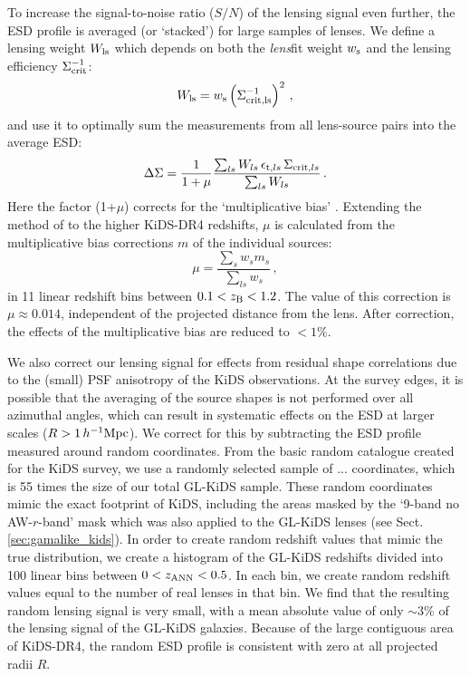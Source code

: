 \documentclass[usenatbib]{mnras}
\newcommand{\hMpc}{\, h^{-1}{\rm{Mpc}} }
\newcommand{\un}[1]{_{\rm #1}}
\begin{document}
To increase the signal-to-noise ratio ($S/N$) of the lensing signal even further, the ESD profile is averaged (or `stacked') for large samples of lenses. We define a lensing weight $W\un{ls}$ which depends on both the \emph{lens}fit weight $w\un{s}$ and the lensing efficiency $\Sigma\un{crit}^{-1}$:
\begin{equation}
	W_{\rm{ls}} = w_{\rm s} \left( \Sigma_{\rm crit,ls}^{-1} \right)^2 \, ,
	\label{eq:weights}
\end{equation}
and use it to optimally sum the measurements from all lens-source pairs into the average ESD:
\begin{equation}
	\Delta\Sigma = \frac{1}{1+\mu} \frac{\sum_{ls} W_{ls} \, \epsilon_{{\rm t},ls} \, \Sigma_{{\rm crit},ls} }{ \sum_{ls}{W_{ls}} }  \, .
	\label{eq:ESDmeasured}
\end{equation}
Here the factor (1+$\mu$) corrects for the `multiplicative bias' \cite[]{fenechconti2017}. Extending the method of \cite{dvornik2017} to the higher KiDS-DR4 redshifts, $\mu$ is calculated from the multiplicative bias corrections $m$ of the individual sources:
\begin{equation}
	\mu=\frac{\sum_{s} w_{s} m_{s}}{\sum_{ls} w_{s}} \, ,
	\label{eq:biascorr}
\end{equation}
in 11 linear redshift bins between \mbox{$0.1<z\un{B}<1.2$}. The value of this correction is $\mu\approx0.014$, independent of the projected distance from the lens. After correction, the effects of the multiplicative bias are reduced to $<1\%$.

We also correct our lensing signal for effects from residual shape correlations due to the (small) PSF anisotropy of the KiDS observations. At the survey edges, it is possible that the averaging of the source shapes is not performed over all azimuthal angles, which can result in systematic effects on the ESD at larger scales ($R>1\hMpc$). We correct for this by subtracting the ESD profile measured around random coordinates. From the basic random catalogue created for the KiDS survey, we use a randomly selected sample of ... coordinates, which is 55 times the size of our total GL-KiDS sample. These random coordinates mimic the exact footprint of KiDS, including the areas masked by the `9-band no AW-$r$-band' mask which was also applied to the GL-KiDS lenses (see Sect. \ref{sec:gamalike_kids}). In order to create random redshift values that mimic the true distribution, we create a histogram of the GL-KiDS redshifts divided into 100 linear bins between $0<z\un{ANN}<0.5$. In each bin, we create random redshift values equal to the number of real lenses in that bin. We find that the resulting random lensing signal is very small, with a mean absolute value of only $\sim3\%$ of the lensing signal of the GL-KiDS galaxies. Because of the large contiguous area of KiDS-DR4, the random ESD profile is consistent with zero at all projected radii $R$.
\end{document}
